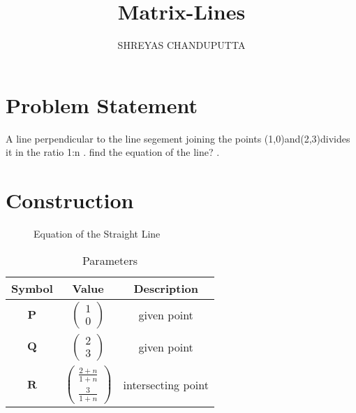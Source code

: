 \documentclass[journal,12pt,twocolumn]{article}
\title{
Matrix-Lines
}
\author{SHREYAS CHANDUPUTTA}
\newcommand{\myvec}[1]{\ensuremath{\begin{pmatrix}#1\end{pmatrix}}}
\let\vec\mathbf
\begin{document}
\maketitle
\tableofcontents
\bigskip
\section{Problem Statement}
A line perpendicular to the line segement joining the points (1,0)and(2,3)divides it in the ratio 1:n . find the equation of the line? .\\
\section{Construction}
\begin{figure}[h]
    \centering
    \caption{Equation of the Straight Line}
    \label{fig:my_label}
\end{figure}
\vspace{2cm}
\begin{table}[h]
    \centering
    \begin{tabular}{|c|c|c|}
       \hline
       \textbf{Symbol}&\textbf{Value}&\textbf{Description}  \\
       \hline
	    $\vec{P}$ & $\myvec{
		    1\\
		    0}$
	    & given point\\
        \hline
	    $\vec{Q}$ & $\myvec{2\\3}$
 & given point\\
        \hline
	    $\vec{R}$ & $\myvec{
  \frac{2+n}{1+n}\\
  \frac{3}{1+n}}$
 & intersecting point  \\
       \hline
    \end{tabular}
    \caption{Parameters}
    \label{tab:my_label}
\end{table}
\end{document}
